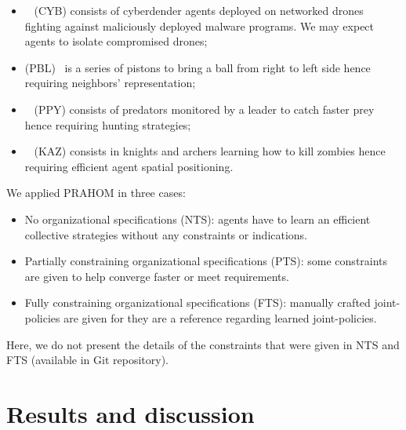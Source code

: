 \documentclass{ecai}
\begin{document}
\begin{itemize}
    \item {}~\cite{cage_challenge_3_announcement} (CYB) consists of cyberdender agents deployed on networked drones fighting against maliciously deployed malware programs. We may expect agents to \allowbreak isolate compromised drones;
    \item {} (PBL)~\cite{Terry2021} is a series of pistons to bring a ball from right to left side hence requiring neighbors' representation;
    \item {}~\cite{Lowe2017} (PPY) consists of predators monitored by a leader to catch faster prey hence requiring hunting strategies;
    \item {}~\cite{Terry2021} (KAZ) consists in knights and archers learning how to kill zombies hence requiring efficient agent spatial positioning.
\end{itemize}
%
\noindent We applied PRAHOM in three cases:
\begin{itemize}
    \item No organizational specifications (NTS): agents have to learn an efficient collective strategies without any constraints or indications.
    \item Partially constraining organizational specifications (PTS): some constraints are given to help converge faster or meet requirements.
    \item Fully constraining organizational specifications (FTS): manually crafted joint-policies are given for they are a reference regarding learned joint-policies.
\end{itemize}

\noindent Here, we do not present the details of the constraints that were given in NTS and FTS (available in Git repository\footnotemark[1]).


\section{Results and discussion}


\end{document}
